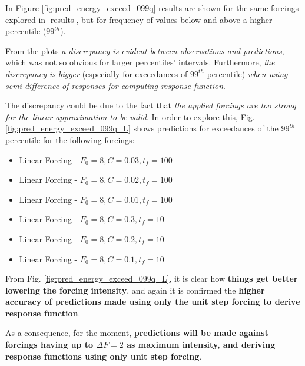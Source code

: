 \documentclass{article}
\begin{document}
In Figure \ref{fig:pred_energy_exceed_099q} results are shown for the same forcings explored in \ref{results}, but for frequency of values below and above a higher percentile ($99^{th}$). 

From the plots \textit{a discrepancy is evident between observations and predictions}, which was not so obvious for larger percentiles' intervals. Furthermore, \textit{the discrepancy is bigger} (especially for exceedances of $99^{th}$ percentile) \textit{when using semi-difference of responses for computing response function}.

The discrepancy could be due to the fact that \textit{the applied forcings are too strong for the linear approximation to be valid}. In order to explore this, Fig. \ref{fig:pred_energy_exceed_099q_L} shows predictions for exceedances of the $99^{th}$ percentile for the following forcings:

\begin{itemize}
	\item Linear Forcing - $F_0=8, C=0.03, t_f=100$
	\item Linear Forcing - $F_0=8, C=0.02, t_f=100$
	\item Linear Forcing - $F_0=8, C=0.01, t_f=100$
	\item Linear Forcing - $F_0=8, C=0.3, t_f=10$
	\item Linear Forcing - $F_0=8, C=0.2, t_f=10$
	\item Linear Forcing - $F_0=8, C=0.1, t_f=10$
\end{itemize}

From Fig. \ref{fig:pred_energy_exceed_099q_L}, it is clear how \textbf{things get better lowering the forcing intensity}, and again it is confirmed the \textbf{higher accuracy of predictions made using only the unit step forcing to derive response function}.

As a consequence, for the moment, \textbf{predictions will be made against forcings having up to $\Delta F=2$ as maximum intensity, and deriving response functions using only unit step forcing}. 
\end{document}
